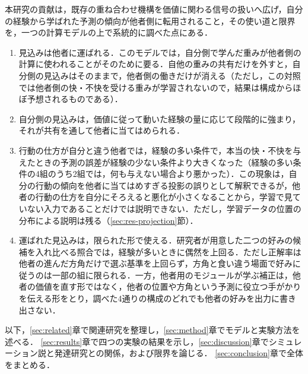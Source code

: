 本研究の貢献は，既存の重ね合わせ機構を価値に関わる信号の扱いへ広げ，自分の経験から学ばれた予測の傾向が他者側に転用されること，その使い道と限界を，一つの計算モデルの上で系統的に調べた点にある．
\begin{enumerate}
  \item 見込みは他者に運ばれる．このモデルでは，自分側で学んだ重みが他者側の計算に使われることがそのために要る．自他の重みの共有だけを外すと，自分側の見込みはそのままで，他者側の働きだけが消える（ただし，この対照では他者側の快・不快を受ける重みが学習されないので，結果は構成からほぼ予想されるものである）．
  \item 自分側の見込みは，価値に従って動いた経験の量に応じて段階的に強まり，それが共有を通して他者に当てはめられる．
  \item 行動の仕方が自分と違う他者では，経験の多い条件で，本当の快・不快を与えたときの予測の誤差が経験の少ない条件より大きくなった（経験の多い条件の4組のうち2組では，何も与えない場合より悪かった）．この現象は，自分の行動の傾向を他者に当てはめすぎる投影の誤りとして解釈できるが，他者の行動の仕方を自分にそろえると悪化が小さくなることから，学習で見ていない入力であることだけでは説明できない．ただし，学習データの位置の分布による説明は残る（\ref{sec:res-projection}節）．
  \item 運ばれた見込みは，限られた形で使える．研究者が用意した二つの好みの候補を入れ比べる照合では，経験が多いときに偶然を上回る．ただし正解率は他者の進んだ方角だけで選ぶ基準を上回らず，方角と食い違う場面で好みに従うのは一部の組に限られる．一方，他者用のモジュールが学ぶ補正は，他者の価値を直す形ではなく，他者の位置や方角という予測に役立つ手がかりを伝える形をとり，調べた4通りの構成のどれでも他者の好みを出力に書き出さない．
\end{enumerate}

以下，\ref{sec:related}章で関連研究を整理し，\ref{sec:method}章でモデルと実験方法を述べる．
\ref{sec:results}章で四つの実験の結果を示し，\ref{sec:discussion}章でシミュレーション説と発達研究との関係，および限界を論じる．
\ref{sec:conclusion}章で全体をまとめる．
